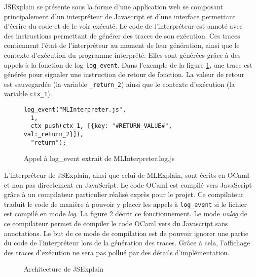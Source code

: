 \documentclass{easychair}
\begin{document}
JSExplain se présente sous la forme d'une application web se composant 
principalement d'un interpréteur de Javascript et d'une interface permettant 
d'écrire du code et de le voir exécuté. Le code de l'interpréteur est annoté 
avec des instructions permettant de générer des traces de son exécution. Ces 
traces contiennent l'état de l'interpréteur au moment de leur génération, ainsi 
que le contexte d'exécution du programme interprété. Elles sont générées grâce à 
des appels à la fonction de log \verb|log_event|. Dans l'exemple de la figure 
\ref{log_event}, une trace est générée pour signaler une instruction de retour 
de fonction. La valeur de retour est sauvegardée (la variable \verb|_return_2|) 
ainsi que le contexte d'exécution (la variable \verb|ctx_1|).

\begin{figure}[ht]
\begin{lstlisting}
log_event("MLInterpreter.js",
  1,
  ctx_push(ctx_1, [{key: "#RETURN_VALUE#", val:_return_2}]),
  "return");
\end{lstlisting}
\caption{Appel à log\_event extrait de MLInterpreter.log.js}
\label{log_event}
\end{figure}

L'interpréteur de JSExplain, ainsi que celui de MLExplain, sont écrits en OCaml 
et non pas directement en JavaScript. Le code OCaml est compilé vers JavaScript 
grâce à un compilateur particulier réalisé exprès pour le projet. Ce compilateur 
traduit le code de manière à pouvoir y placer les appels à \verb|log_event| si 
le fichier est compilé en mode \emph{log}. La figure \ref{arch_jsexplain} 
décrit ce fonctionnement. Le mode \emph{unlog} de ce compilateur permet de 
compiler le code OCaml vers du Javascript sans annotations. Le but de ce mode 
de compilation est de pouvoir ignorer une partie du code de l'interpréteur lors 
de la génération des traces. Grâce à cela, l'affichage des traces d'exécution 
ne sera pas pollué par des détails d'implémentation.

\begin{figure}[ht]
  
  \caption{Architecture de JSExplain}
  \label{arch_jsexplain}
\end{figure}
\end{document}
